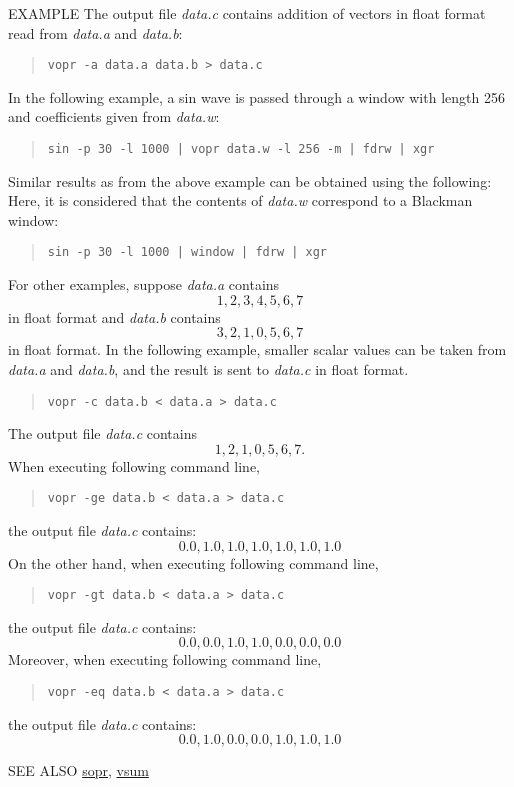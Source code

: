 \begin{qsection}{EXAMPLE}
The output file {\em data.c} contains addition of
vectors in float format read from {\em data.a} and {\em data.b}:
\begin{quote}
  \verb!vopr -a data.a data.b > data.c !
\end{quote}
\par
In the following example, a sin wave is passed through
a window with length 256 and coefficients given from
{\em data.w}:
\begin{quote}
  \verb!sin -p 30 -l 1000 | vopr data.w -l 256 -m | fdrw | xgr!
\end{quote}
Similar results as from the above example can be obtained using the following:
 Here, it is considered that the contents of {\em data.w} correspond to a Blackman window:
\begin{quote}
  \verb!sin -p 30 -l 1000 | window | fdrw | xgr!
\end{quote}
For other examples, suppose {\em data.a} contains
\begin{displaymath}
  1, 2, 3, 4, 5, 6, 7
\end{displaymath}
in float format and {\em data.b} contains
\begin{displaymath}
  3, 2, 1, 0, 5, 6, 7
\end{displaymath}
in float format.
In the following example,
smaller scalar values can be taken from
{\em data.a} and {\em data.b}, and
the result is sent to {\em data.c} in float format.
\begin{quote}
  \verb!vopr -c data.b < data.a > data.c !
\end{quote}
The output file {\em data.c} contains
\begin{displaymath}
  1, 2, 1, 0, 5, 6, 7.
\end{displaymath}
When executing following command line,
\begin{quote}
  \verb!vopr -ge data.b < data.a > data.c !
\end{quote}
the output file {\em data.c} contains:
\begin{displaymath}
  0.0, 1.0, 1.0, 1.0, 1.0, 1.0, 1.0
\end{displaymath}
On the other hand, when executing following command line,
\begin{quote}
  \verb!vopr -gt data.b < data.a > data.c !
\end{quote}
the output file {\em data.c} contains:
\begin{displaymath}
  0.0, 0.0, 1.0, 1.0, 0.0, 0.0, 0.0
\end{displaymath}
Moreover, when executing following command line,
\begin{quote}
  \verb!vopr -eq data.b < data.a > data.c !
\end{quote}
the output file {\em data.c} contains:
\begin{displaymath}
  0.0, 1.0, 0.0, 0.0, 1.0, 1.0, 1.0
\end{displaymath}
\end{qsection}


\begin{qsection}{SEE ALSO}
\hyperlink{sopr}{sopr},
\hyperlink{vsum}{vsum}
\end{qsection}
